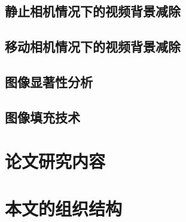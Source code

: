 \subsection{静止相机情况下的视频背景减除}
\label{sec:staticCamera}

\subsection{移动相机情况下的视频背景减除}
\label{sec:movingCamera}

\subsection{图像显著性分析}
\label{sec:imageSaliency}


\subsection{图像填充技术}
\label{sec:imageInpainting}

\section{论文研究内容}
\label{sec:contents}


\section{本文的组织结构}
\label{sec:hierarchy}